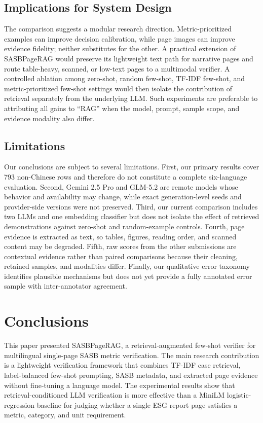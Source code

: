 \documentclass[sigconf,article]{acmart}
\newcommand{\SASBPageRAG}{SASB\-Page\-RAG}
\newcommand{\retraug}{retrieval\allowbreak-augmented}
\newcommand{\logreg}{logistic\allowbreak-regression}
\begin{document}
\subsection{Implications for System Design}
The comparison suggests a modular research direction. Metric-prioritized examples can improve decision calibration, while page images can improve evidence fidelity; neither substitutes for the other. A practical extension of \SASBPageRAG{} would preserve its lightweight text path for narrative pages and route table-heavy, scanned, or low-text pages to a multimodal verifier. A controlled ablation among zero-shot, random few-shot, TF-IDF few-shot, and metric-prioritized few-shot settings would then isolate the contribution of retrieval separately from the underlying LLM. Such experiments are preferable to attributing all gains to ``RAG'' when the model, prompt, sample scope, and evidence modality also differ.

\subsection{Limitations}
Our conclusions are subject to several limitations. First, our primary results cover 793 non-Chinese rows and therefore do not constitute a complete six-language evaluation. Second, Gemini 2.5 Pro and GLM-5.2 are remote models whose behavior and availability may change, while exact generation-level seeds and provider-side versions were not preserved. Third, our current comparison includes two LLMs and one embedding classifier but does not isolate the effect of retrieved demonstrations against zero-shot and random-example controls. Fourth, page evidence is extracted as text, so tables, figures, reading order, and scanned content may be degraded. Fifth, raw scores from the other submissions are contextual evidence rather than paired comparisons because their cleaning, retained samples, and modalities differ. Finally, our qualitative error taxonomy identifies plausible mechanisms but does not yet provide a fully annotated error sample with inter-annotator agreement.

\section{Conclusions}
This paper presented \SASBPageRAG{}, a \retraug{} few-shot verifier for multilingual single-page SASB metric verification. The main research contribution is a lightweight verification framework that combines TF-IDF case retrieval, label-balanced few-shot prompting, SASB metadata, and extracted page evidence without fine-tuning a language model. The experimental results show that retrieval-conditioned LLM verification is more effective than a MiniLM \logreg{} baseline for judging whether a single ESG report page satisfies a metric, category, and unit requirement.
\end{document}

